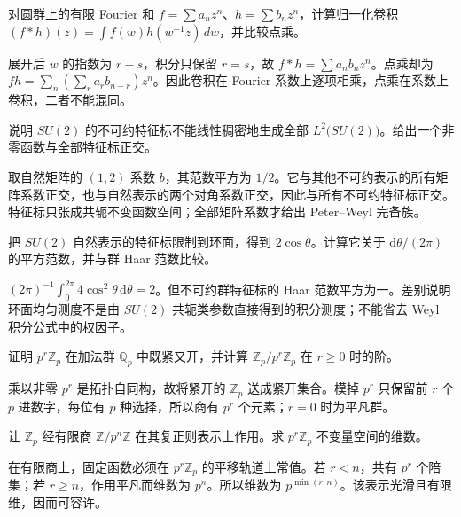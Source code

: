 \begin{exercise}\label{b5:ex:C-fourier-convolution}
	对圆群上的有限 Fourier 和 \(f=\sum a_nz^n\)、\(h=\sum b_nz^n\)，计算归一化卷积 \((f*h)(z)=\int f(w)h(w^{-1}z)\,dw\)，并比较点乘。
\end{exercise}
\begin{solution}
	展开后 \(w\) 的指数为 \(r-s\)，积分只保留 \(r=s\)，故 \(f*h=\sum a_nb_nz^n\)。点乘却为 \(fh=\sum_n(\sum_r a_rb_{n-r})z^n\)。因此卷积在 Fourier 系数上逐项相乘，点乘在系数上卷积，二者不能混同。
\end{solution}

\begin{exercise}\label{b5:ex:C-characters-not-all-functions}
	说明 \(SU(2)\) 的不可约特征标不能线性稠密地生成全部 \(L^2\bigl(SU(2)\bigr)\)。给出一个非零函数与全部特征标正交。
\end{exercise}
\begin{solution}
	取自然矩阵的 \((1,2)\) 系数 \(b\)，其范数平方为 \(1/2\)。它与其他不可约表示的所有矩阵系数正交，也与自然表示的两个对角系数正交，因此与所有不可约特征标正交。特征标只张成共轭不变函数空间；全部矩阵系数才给出 Peter--Weyl 完备族。
\end{solution}

\begin{exercise}\label{b5:ex:C-torus-measure-warning}
	把 \(SU(2)\) 自然表示的特征标限制到环面，得到 \(2\cos\theta\)。计算它关于 \(\mathrm{d}\theta/(2\pi)\) 的平方范数，并与群 Haar 范数比较。
\end{exercise}
\begin{solution}
	\((2\pi)^{-1}\int_0^{2\pi}4\cos^2\theta\,\mathrm{d}\theta=2\)。但不可约群特征标的 Haar 范数平方为一。差别说明环面均匀测度不是由 \(SU(2)\) 共轭类参数直接得到的积分测度；不能省去 Weyl 积分公式中的权因子。
\end{solution}

\begin{exercise}\label{b5:ex:C-padic-cosets}
	证明 \(p^r\mathbb Z_p\) 在加法群 \(\mathbb Q_p\) 中既紧又开，并计算 \(\mathbb Z_p/p^r\mathbb Z_p\) 在 \(r\ge0\) 时的阶。
\end{exercise}
\begin{solution}
	乘以非零 \(p^r\) 是拓扑自同构，故将紧开的 \(\mathbb Z_p\) 送成紧开集合。模掉 \(p^r\) 只保留前 \(r\) 个 \(p\) 进数字，每位有 \(p\) 种选择，所以商有 \(p^r\) 个元素；\(r=0\) 时为平凡群。
\end{solution}

\begin{exercise}\label{b5:ex:C-profinite-regular-invariants}
	让 \(\mathbb Z_p\) 经有限商 \(\mathbb Z/p^n\mathbb Z\) 在其复正则表示上作用。求 \(p^r\mathbb Z_p\) 不变量空间的维数。
\end{exercise}
\begin{solution}
	在有限商上，固定函数必须在 \(p^r\mathbb Z_p\) 的平移轨道上常值。若 \(r<n\)，共有 \(p^r\) 个陪集；若 \(r\ge n\)，作用平凡而维数为 \(p^n\)。所以维数为 \(p^{\min(r,n)}\)。该表示光滑且有限维，因而可容许。
\end{solution}

